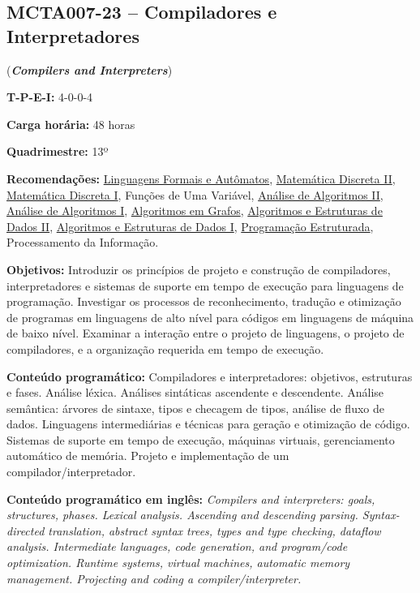 \documentclass[class=article, crop=false]{standalone}
\begin{document}
\subsection*{MCTA007-23 -- Compiladores e Interpretadores}
\label{disc:compi}

(\textbf{\textit{Compilers and Interpreters}})

\begin{center}
    \begin{minipage}{0.85\textwidth}
        \textbf{T-P-E-I:} 4-0-0-4
        
        \textbf{Carga horária:} 48 horas
        
        \textbf{Quadrimestre:} 13º
        
        \textbf{Recomendações:} 
        \hyperref[disc:lfa]{Linguagens Formais e Autômatos},
        \hyperref[disc:mdII]{Matemática Discreta II},
        \hyperref[disc:mdI]{Matemática Discreta I},
        Funções de Uma Variável,
        \hyperref[disc:aaII]{Análise de Algoritmos II},
        \hyperref[disc:aaI]{Análise de Algoritmos I},
        \hyperref[disc:ag]{Algoritmos em Grafos},
        \hyperref[disc:aedII]{Algoritmos e Estruturas de Dados II},
        \hyperref[disc:aedI]{Algoritmos e Estruturas de Dados I},
        \hyperref[disc:pe]{Programação Estruturada},
        Processamento da Informação.
    \end{minipage}
\end{center}

\textbf{Objetivos:}
Introduzir os princípios de projeto e construção de compiladores, interpretadores e sistemas de suporte
em tempo de execução para linguagens de programação. Investigar os processos de reconhecimento, tradução 
e otimização de programas em linguagens de alto nível para códigos em linguagens de máquina de baixo nível.
Examinar a interação entre o projeto de linguagens, o projeto de compiladores, e a organização requerida em
tempo de execução.

\textbf{Conteúdo programático:}
Compiladores e interpretadores: objetivos, estruturas e fases.
Análise léxica. 
Análises sintáticas ascendente e descendente. 
Análise semântica: árvores de sintaxe, tipos e checagem de tipos, análise de fluxo de dados.
Linguagens intermediárias e técnicas para geração e otimização de código.
Sistemas de suporte em tempo de execução, máquinas virtuais, gerenciamento automático de memória.
Projeto e implementação de um compilador/interpretador.

\textbf{Conteúdo programático em inglês:}
\textit{
Compilers and interpreters: goals, structures, phases.
Lexical analysis.
Ascending and descending parsing.
Syntax-directed translation, abstract syntax trees, types and type checking, dataflow analysis.
Intermediate languages, code generation, and program/code optimization.
Runtime systems, virtual machines, automatic memory management.
Projecting and coding a compiler/interpreter.
}
\end{document}

